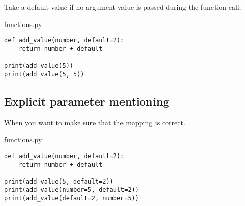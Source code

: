 \documentclass[aspectratio=1610,slidestop]{beamer}
\begin{document}
\begin{pframe}
 Take a default value if no argument value is passed during the function call.
 \medskip

 \begin{minipage}[t]{0.47\textwidth}
  \begin{pythonfile}{functions.py}
   \begin{verbatim}
def add_value(number, default=2):
    return number + default

print(add_value(5))
print(add_value(5, 5))
   \end{verbatim}
  \end{pythonfile}
 \end{minipage}\qquad
 \begin{minipage}[t]{0.47\textwidth}
  \vspace{-3.05cm}
  \begin{terminal}
  \end{terminal}
 \end{minipage}
\end{pframe}


\subsection{Explicit parameter mentioning}
\begin{pframe}
 When you want to make sure that the mapping is correct.
 \medskip

 \begin{minipage}[t]{0.51\textwidth}
  \begin{pythonfile}{functions.py}
   \begin{verbatim}
def add_value(number, default=2):
    return number + default

print(add_value(5, default=2))
print(add_value(number=5, default=2))
print(add_value(default=2, number=5))
   \end{verbatim}
  \end{pythonfile}
 \end{minipage}\qquad
 \begin{minipage}[t]{0.43\textwidth}
  \vspace{-3.45cm}
  \begin{terminal}
  \end{terminal}
 \end{minipage}
\end{pframe}
\end{document}
